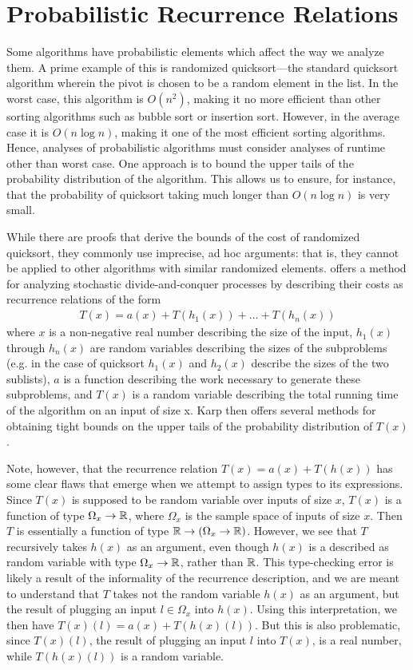 \section{Probabilistic Recurrence Relations}

Some algorithms have probabilistic elements which affect the way we analyze them. A prime example of this is randomized 
quicksort---the standard quicksort algorithm wherein the pivot is chosen to be a random element in the list. In the worst case,
this algorithm is $O(n^2)$, making it no more efficient than other sorting algorithms such as bubble sort or insertion sort. 
However, in the average case it is $O(n\log n)$, making it one of the most efficient sorting algorithms. Hence, analyses of probabilistic algorithms must consider analyses of runtime other than worst case. One approach is to bound the upper
tails of the probability distribution of the algorithm. This allows us to ensure, for instance, that the probability of 
quicksort taking much longer than $O(n \log n)$ is very small. 

While there are proofs that derive the bounds of the cost of randomized quicksort, they commonly use
imprecise, ad hoc arguments: that is, they cannot be applied to other algorithms with similar randomized elements. 
\cite{Karp} offers a method for analyzing stochastic divide-and-conquer processes by describing their costs as recurrence relations of the form
\begin{align*}
T(x) = a(x) + T(h_1(x)) + \dots + T(h_n(x))
\end{align*}
where $x$ is a non-negative real number describing the size of the input, $h_1(x)$ through $h_n(x)$ are random 
variables describing the sizes of the subproblems (e.g. in the case of quicksort $h_1(x)$ and $h_2(x)$ describe the sizes 
of the two sublists), $a$ is a function describing the work necessary to generate these subproblems, and $T(x)$ is a 
random variable describing the total running time of the algorithm on an input of size x. Karp then offers several methods 
for obtaining tight bounds on the upper tails of the probability distribution of $T(x)$. 

Note, however, that the recurrence relation $T(x) = a(x) + T(h(x))$ has some clear flaws that 
emerge when we attempt to assign types to its expressions. Since $T(x)$ is supposed to be random
variable over inputs of size $x$, $T(x)$ is a function of type 
$\Omega_x \rightarrow \mathbb{R}$, where $\Omega_x$ is the sample space of inputs of size $x$. Then $T$ is essentially a 
function of type $\mathbb{R} \rightarrow (\Omega_x \rightarrow \mathbb{R})$. However, we see that $T$ recursively takes 
$h(x)$ as an argument, even though $h(x)$ is a described as random variable with type $\Omega_x \rightarrow \mathbb{R}$, 
rather than $\mathbb{R}$. This type-checking error is likely a result of the informality of the recurrence description, 
and we are meant to understand that $T$ takes not the 
random variable $h(x)$ as an argument, but the result of plugging an input $l \in \Omega_x$ into $h(x)$. Using this 
interpretation, we then have $T(x)(l) = a(x) + T(h(x)(l))$. But this is also problematic, since $T(x)(l)$, the result 
of plugging an input $l$ into $T(x)$, is a real number, while $T(h(x)(l))$ is a random variable. 

